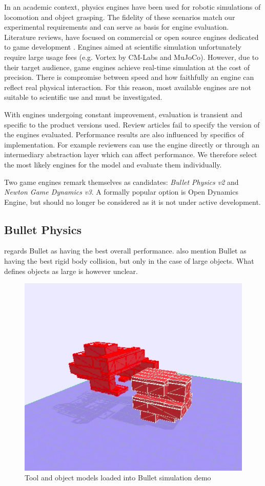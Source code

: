 \documentclass[11]{article}
\begin{document}
In an academic context, physics engines have been used for robotic simulations of locomotion and object grasping.
The fidelity of these scenarios match our experimental requirements and can serve as basis for engine evaluation. 
Literature reviews, have focused on commercial or open source engines dedicated to game development \cite{boeing2007,roennau2013,hummel2012}. 
Engines aimed at scientific simulation unfortunately require large usage fees (e.g. Vortex by CM-Labs and MuJoCo).
However, due to their target audience, game engines achieve real-time simulation at the cost of precision. 
There is compromise between speed and how faithfully an engine can reflect real physical interaction.
For this reason, most available engines are not suitable to scientific use and must be investigated. 

With engines undergoing constant improvement, evaluation is transient and specific to the product versions used. 
Review articles fail to specify the version of the engines evaluated.
Performance results are also influenced by specifics of implementation. For example reviewers can use the engine directly or through an intermediary abstraction layer which can affect performance.  
We therefore select the most likely engines for the model and evaluate them individually. 

Two game engines remark themselves as candidates: \emph{Bullet Physics v2} and \emph{Newton Game Dynamics v3}.
A formally popular option is Open Dynamics Engine, but should no longer be considered as it is not under active development. 

\subsection{Bullet Physics}
\cite{boeing2007} regards Bullet as having the best overall performance. 
\cite{hummel2012,roennau2013} also mention Bullet as having the best rigid body collision, but only in the case of large objects.
What defines objects as large is however unclear. 

\begin{figure}[h]
  \centering
  \includegraphics[width=.5\textwidth]{./figures/bullet_demo.png}
  \caption{Tool and object models loaded into Bullet simulation demo}
  \label{fig:bullet_demo}
\end{figure}      
\end{document}
